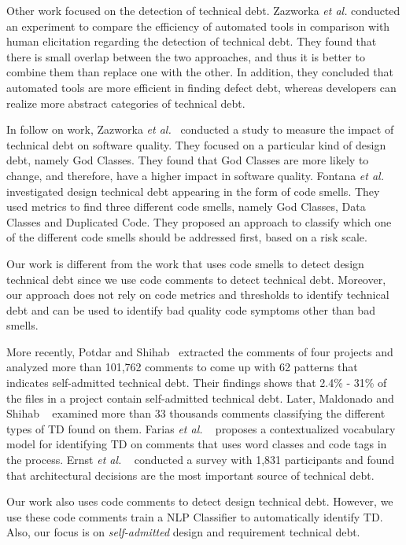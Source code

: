 Other work focused on the detection of technical debt. Zazworka \textit{et al.} \cite{Zazworka2013CSE} conducted an experiment to compare the efficiency of automated tools in comparison with human elicitation regarding the detection of technical debt. They found that there is small overlap between the two approaches, and thus it is better to combine them than replace one with the other. In addition, they concluded that automated tools are more efficient in finding defect debt, whereas developers can realize more abstract categories of technical debt.

In follow on work, Zazworka \textit{et al.}~\cite{Zazworka2011MTD} conducted a study to measure the impact of technical debt on software quality. They focused on a particular kind of design debt, namely God Classes. They found that God Classes are more likely to change, and therefore, have a higher impact in software quality. Fontana \textit{et al.}~\cite{Fontana2012MTD} investigated design technical debt appearing in the form of code smells. They used metrics to find three different code smells, namely God Classes, Data Classes and Duplicated Code. They proposed an approach to classify which one of the different code smells should be addressed first, based on a risk scale. 

Our work is different from the work that uses code smells to detect design technical debt since we use code comments to detect technical debt. Moreover, our approach does not rely on code metrics and thresholds to identify technical debt and can be used to identify bad quality code symptoms other than bad smells.

More recently, Potdar and Shihab~\cite{Potdar2014ICSME} extracted the comments of four projects and analyzed more than 101,762 comments to come up with 62  patterns that indicates self-admitted technical debt. Their findings shows that 2.4\% - 31\% of the files in a project contain self-admitted technical debt. Later, Maldonado and Shihab ~\cite{Maldonado2015MTD} examined more than 33 thousands comments classifying the different types of TD found on them. Farias \textit{et al.} ~\cite{Farias2015MTD} proposes a contextualized vocabulary model for identifying TD on comments that uses word classes and code tags in the process. Ernst \textit{et al.} ~\cite{Ernst2015FSE} conducted a survey with 1,831 participants and found that architectural decisions are the most important source of technical debt.

Our work also uses code comments to detect design technical debt. However, we use these code comments train a NLP Classifier to automatically identify TD. Also, our focus is on \emph{self-admitted} design and requirement technical debt.

